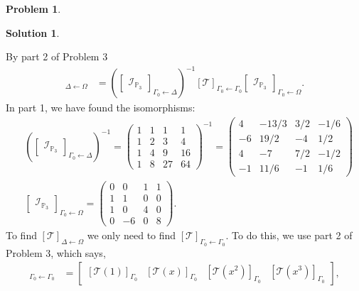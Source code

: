 \documentclass{book}
\theoremstyle{definition}
\newtheorem*{prob*}{Problem}
\newtheorem*{sln*}{Solution}
\newcommand{\T}{\mathcal{T}}
\begin{document}
\begin{prob*}
\begin{sln*}
\begin{enumerate}
\begin{enumerate}
				By part 2 of Problem 3
				\begin{align*}
				[\mathcal{T}]_{\Delta \leftarrow \Omega} &= 
				\left(\begin{bmatrix}
				\mathcal{I}_{\mathbb{P}_3}
				\end{bmatrix}_{\Gamma_0 \leftarrow \Delta}\right)^{-1} [\mathcal{T}]_{\Gamma_0 \leftarrow \Gamma_0} 
				\begin{bmatrix}
				\mathcal{I}_{\mathbb{P}_3}
				\end{bmatrix}_{\Gamma_0 \leftarrow \Omega}.
				\end{align*}
				In part 1, we have found the isomorphisms:
				\begin{align*}
				&\left(\begin{bmatrix}
				\mathcal{I}_{\mathbb{P}_3}
				\end{bmatrix}_{\Gamma_0 \leftarrow \Delta}\right)^{-1} = \begin{pmatrix}
				1&1&1&1\\
				1&2&3&4\\
				1&4&9&16\\
				1&8&27&64
				\end{pmatrix}^{-1} = 
				\begin{pmatrix}
				4&-13/3&3/2&-1/6\\
				-6&19/2&-4&1/2\\
				4&-7&7/2&-1/2\\
				-1&11/6&-1&1/6
				\end{pmatrix}\\
				&\begin{bmatrix}
				\mathcal{I}_{\mathbb{P}_3}
				\end{bmatrix}_{\Gamma_0 \leftarrow \Omega}
				= \begin{pmatrix}
				0&0&1&1\\
				1&1&0&0\\
				1&0&4&0\\
				0&-6&0&8
				\end{pmatrix}.
				\end{align*}
				To find $[\T]_{\Delta\leftarrow\Omega}$ we only need to find $[\T]_{\Gamma_0\leftarrow\Gamma_0}$. To do this, we use part 2 of Problem 3, which says,
				\begin{align*}
				[\T]_{\Gamma_0\leftarrow\Gamma_0} &= \begin{bmatrix}
				[\T(1)]_{\Gamma_0} & [\T(x)]_{\Gamma_0} & [\T(x^2)]_{\Gamma_0} & [\T(x^3)]_{\Gamma_0}
				\end{bmatrix},
				\end{align*}

\end{enumerate}
\end{enumerate}
\end{sln*}
\end{prob*}
\end{document}

